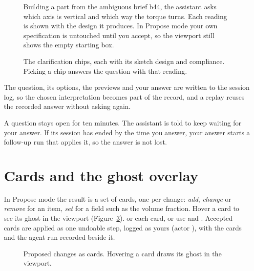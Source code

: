 \begin{figure}[t]
\caption{Building a part from the ambiguous brief b44, the assistant asks which axis is vertical and which way the
torque turns. Each reading is shown with the design it produces. In Propose mode your own specification is untouched
until you accept, so the viewport still shows the empty starting box.}
\label{fig:clarify}
\end{figure}

\begin{figure}[tb]
\begin{minipage}[b]{0.4\linewidth}\end{minipage}\hfill
\begin{minipage}[b]{0.55\linewidth}
\caption{The clarification chips, each with its sketch design and compliance. Picking a chip answers the question
with that reading.}
\label{fig:chips}
\end{minipage}
\end{figure}

The question, its options, the previews and your answer are written to the session log, so the chosen interpretation
becomes part of the record, and a replay reuses the recorded answer without asking again.

\begin{tipbox}
A question stays open for ten minutes. The assistant is told to keep waiting for your answer. If its session has ended
by the time you answer, your answer starts a follow-up run that applies it, so the answer is not lost.
\end{tipbox}

\section{Cards and the ghost overlay}\label{sec:cards}
In Propose mode the result is a set of cards, one per change: \emph{add}, \emph{change} or \emph{remove} for an item,
\emph{set} for a field such as the volume fraction. Hover a card to see its ghost in the viewport
(Figure~\ref{fig:cards}).  or  each card, or use  and . Accepted
cards are applied as one undoable step, logged as yours (actor ), with the cards and the agent run recorded
beside it.

\begin{figure}[t]
\caption{Proposed changes as cards. Hovering a card draws its ghost in the viewport.}
\label{fig:cards}
\end{figure}

